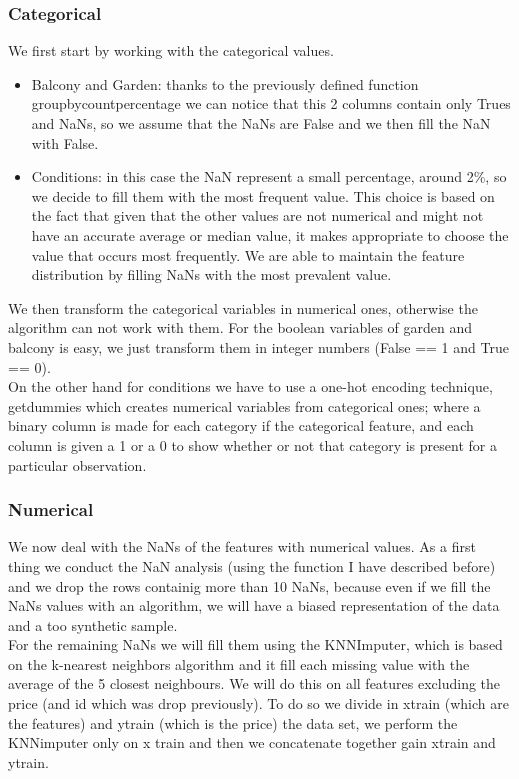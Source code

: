 \documentclass[10pt, notitlepage]{article}
\begin{document}
\subsubsection{Categorical}
\color{black}
We first start by working with the categorical values.
\begin{itemize}
    \item Balcony and Garden: thanks to the previously defined function groupby\textunderscore count\textunderscore percentage we can notice that this 2 columns contain only Trues and NaNs, so we assume that the NaNs are False and we then fill the NaN with False. 
    \item Conditions: in this case the NaN represent a small percentage, around 2\%, so we decide to fill them with the most frequent value. This choice is based on the fact that given that the other values are  not numerical and might not have an accurate average or median value, it makes appropriate to choose the value that occurs most frequently. We are able to maintain the feature distribution by filling NaNs with the most prevalent value.
\end{itemize}
We then transform the categorical variables in numerical ones, otherwise the algorithm can not work with them. For the boolean variables of garden and balcony is easy, we just transform them in integer numbers (False == 1 and True == 0). 
\\
On the other hand for conditions we have to use a one-hot encoding technique, get\textunderscore dummies which creates numerical variables from categorical ones; where a binary column is made for each category if the categorical feature, and each column is given a 1 or a 0 to show whether or not that category is present for a particular observation.

\color{blue}
\subsubsection{Numerical}
\color{black}
We now deal with the NaNs of the features with numerical values. As a first thing we conduct the NaN analysis (using the function I have described before) and we drop the rows containig more than 10 NaNs, because even if we fill the NaNs values with an algorithm, we will have a biased representation of the data and a too synthetic sample. 
\\
For the remaining NaNs we will fill them using the KNNImputer, which is based on the k-nearest neighbors algorithm and it fill each missing value with the average of the 5 closest neighbours. We will do this on all features excluding the price (and id which was drop previously). To do so we divide in x\textunderscore train (which are the features) and y\textunderscore train (which is the price) the data set, we perform the KNNimputer only on x \textunderscore train and then we concatenate together gain x\textunderscore train and y\textunderscore train. 
\end{document}
